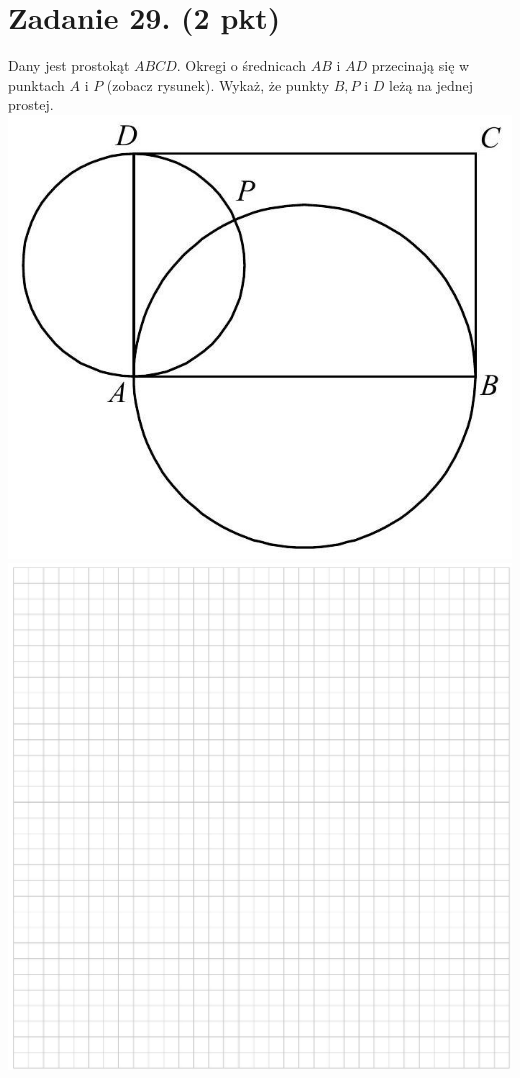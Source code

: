 \documentclass[10pt]{article}
\begin{document}
\section*{Zadanie 29. (2 pkt)}
Dany jest prostokąt \(A B C D\). Okregi o średnicach \(A B\) i \(A D\) przecinają się w punktach \(A\) i \(P\) (zobacz rysunek). Wykaż, że punkty \(B, P\) i \(D\) leżą na jednej prostej.\\
\includegraphics[max width=\textwidth, center]{2024_11_21_603d5c1b2a7d8d68f45fg-14}\\
\includegraphics[max width=\textwidth, center]{2024_11_21_603d5c1b2a7d8d68f45fg-14(1)}
\end{document}
